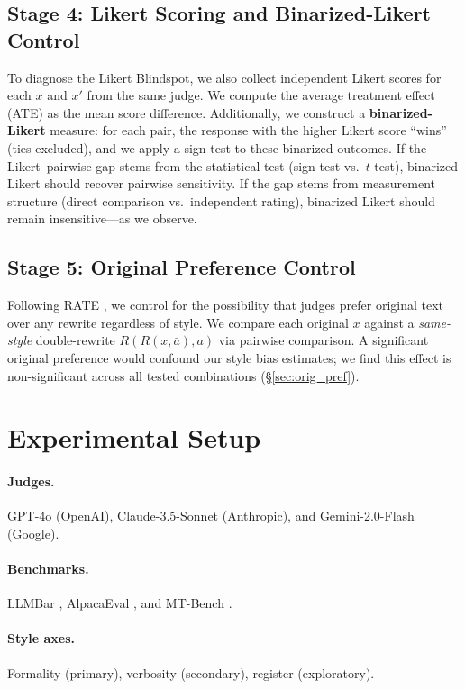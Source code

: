 \documentclass[11pt]{article}
\begin{document}
\subsection{Stage 4: Likert Scoring and Binarized-Likert Control}
To diagnose the Likert Blindspot, we also collect independent Likert scores for each $x$ and $x'$ from the same judge.
We compute the average treatment effect (ATE) as the mean score difference.
Additionally, we construct a \textbf{binarized-Likert} measure: for each pair, the response with the higher Likert score ``wins'' (ties excluded), and we apply a sign test to these binarized outcomes.
If the Likert--pairwise gap stems from the statistical test (sign test vs.\ $t$-test), binarized Likert should recover pairwise sensitivity.
If the gap stems from measurement structure (direct comparison vs.\ independent rating), binarized Likert should remain insensitive---as we observe.

\subsection{Stage 5: Original Preference Control}
Following RATE \cite{feuer2025rate}, we control for the possibility that judges prefer original text over any rewrite regardless of style.
We compare each original $x$ against a \emph{same-style} double-rewrite $R(R(x, \bar{a}), a)$ via pairwise comparison.
A significant original preference would confound our style bias estimates; we find this effect is non-significant across all tested combinations (\S\ref{sec:orig_pref}).

\section{Experimental Setup}

\paragraph{Judges.} GPT-4o (OpenAI), Claude-3.5-Sonnet (Anthropic), and Gemini-2.0-Flash (Google).
\paragraph{Benchmarks.} LLMBar \cite{zeng2024llmbar}, AlpacaEval \cite{li2023alpacaeval}, and MT-Bench \cite{zheng2023judging}.
\paragraph{Style axes.} Formality (primary), verbosity (secondary), register (exploratory).
\end{document}
